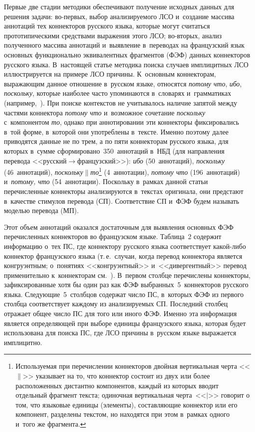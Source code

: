 \begin{multicols}{2}
Первые две стадии методики обеспечивают получение исходных данных для решения задачи: во-пер\-вых, 
выбор анализируемого ЛСО и~создание массива аннотаций тех коннекторов русского языка, которые могут 
считаться прототипическими средствами выражения этого ЛСО; во-вто\-рых, анализ полученного массива 
аннотаций и~выявление в~переводах на французский язык основных функционально эквивалентных 
фрагментов (ФЭФ) данных коннекторов русского языка. 
В~настоящей статье методика поиска случаев 
имплицитных ЛСО ил\-люст\-ри\-ру\-ет\-ся на примере ЛСО причины. К~основным коннекторам, выражающим 
данное отношение в~русском языке, относятся \textit{потому что}, \textit{ибо}, \textit{поскольку}, которые 
наиболее часто упоминаются в~словарях и~грамматиках  
(например,~\cite[с.~577--583]{12-in}). При поиске контекстов не учитывалось наличие запятой между 
частями коннектора \textit{потому что} и~возможное сочетание \textit{поскольку} с~компонентом 
\textit{то}, однако при аннотировании эти коннекторы фиксировались в~той форме, в~которой они 
употреблены в~тексте. Именно поэтому далее приводятся данные не по трем, а по пяти коннекторам 
русского языка, для которых в~сумме сформировано~350~аннотаций в~НБД (для направления перевода  
<<рус\-ский\;$\to$\;фран\-цуз\-ский>>): \textit{ибо} (50~аннотаций), \textit{поскольку} (46~аннотаций), 
\textit{поскольку}$\|$\textit{то}\footnote{Используемая при перечислении 
коннекторов двойная 
вертикальная черта <<$\|$>> указывает на то, что коннектор состоит из двух или более расположенных 
дистантно компонентов, каждый из которых вводит отдельный фрагмент текста; 
одиночная вертикальная 
черта~<<$\vert$>> говорит о том, что языковые единицы (элементы), составляющие коннектор или его 
компонент, разделены текстом, но находятся при этом в~рамках одного и~того же фрагмента.} 
(4~аннотации), \textit{потому что} (196~аннотаций) и~\textit{потому, что} (54~аннотации). Поскольку 
в~рамках данной статьи перечисленные коннекторы анализируются в~текстах оригинала, они предстают 
в~качестве стимулов перевода (СП). Соответствие СП и~ФЭФ будем называть моделью перевода (МП).
   
   Этот объем аннотаций оказался достаточным для выявления основных 
ФЭФ перечисленных коннекторов во французском языке. Таблица~2 
содержит информацию о~тех ПС, где коннектору русского языка 
соответствует ка\-кой-ли\-бо коннектор французского языка (т.\,е.\ случаи, 
когда перевод коннектора является конгруэнтным; о~понятиях 
<<конгруэнтный>> и~<<дивергентный>> перевод применительно 
к~коннекторам см.~\cite{13-in}). В~первом столбце пе\-ре\-чис\-ле\-ны  
коннекторы, зафиксированные хотя бы один раз как ФЭФ 
выбранных~5~коннекторов русского языка. Следующие~5~столб\-цов 
содержат число ПС, в~которых ФЭФ из первого столбца соответствует 
каждому из анализируемых СП. Последний столбец отражает общее число 
ПС для того или иного ФЭФ. Именно эта информация является 
определяющей при выборе единицы французского языка, которая будет 
использована для поиска ПС, где ЛСО причины в~русском языке выражается 
имплицитно.


\end{multicols}
